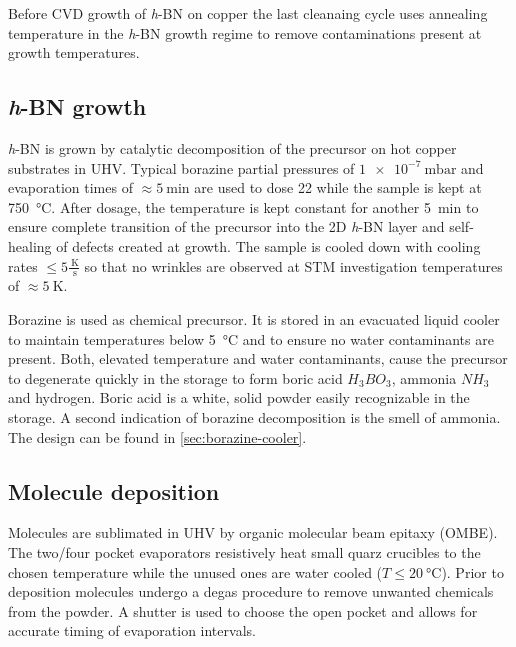 Before CVD growth of \textit{h}-BN on copper the last cleanaing cycle uses annealing temperature in the \textit{h}-BN growth regime to remove contaminations present at growth temperatures.

\subsection{\textit{h}-BN growth}
\label{sec:h-BN-growth}
\textit{h}-BN is grown by catalytic decomposition of the  precursor on hot copper substrates in UHV. Typical borazine partial pressures of $\SI{1e-7}{\milli \bar}$ and evaporation times of $\approx \SI{5}{\minute}$ are used to dose \SI{22}{\langmuir} while the sample is kept at \SI{750}{\celsius}. After dosage, the temperature is kept constant for another \SI{5}{\minute} to ensure complete transition of the precursor into the 2D \textit{h}-BN layer and self-healing of defects created at growth. The sample is cooled down with cooling rates $\leq 5 \frac{\SI{}{\kelvin}}{\SI{}{\second}}$ so that no wrinkles are observed at STM investigation temperatures of $\approx \SI{5}{\kelvin}$.

Borazine is used as chemical precursor. It is stored in an evacuated liquid cooler to maintain temperatures below \SI{5}{\celsius} and to ensure no water contaminants are present. Both, elevated temperature and water contaminants, cause the precursor to degenerate quickly in the storage to form boric acid $H_3BO_3$, ammonia $NH_3$ and hydrogen. Boric acid is a white, solid powder easily recognizable in the storage. A second indication of borazine decomposition is the smell of ammonia. The design can be found in \autoref{sec:borazine-cooler}.

\subsection{Molecule deposition}
\label{sec:molecule-deposition}
Molecules are sublimated in UHV by organic molecular beam epitaxy (OMBE). The two/four pocket evaporators resistively heat small quarz crucibles to the chosen temperature while the unused ones are water cooled ($T\leq \SI{20}{\celsius}$). Prior to deposition molecules undergo a degas procedure to remove unwanted chemicals from the powder. A shutter is used to choose the open pocket and allows for accurate timing of evaporation intervals.

